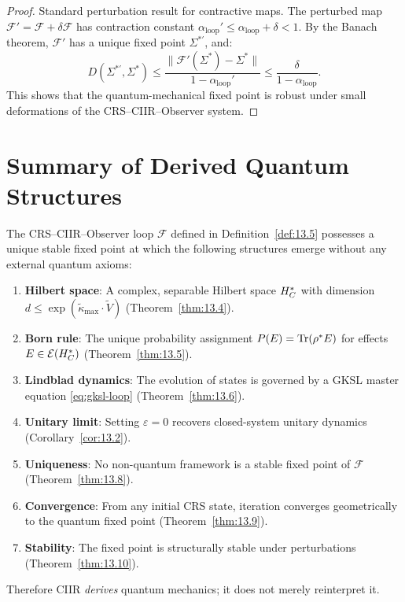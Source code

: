 \begin{proof}
Standard perturbation result for contractive maps.  The perturbed
map $\mathcal{F}' = \mathcal{F} + \delta\mathcal{F}$ has contraction
constant $\alpha_{\mathrm{loop}}' \leq \alpha_{\mathrm{loop}} + \delta
< 1$.  By the Banach theorem, $\mathcal{F}'$ has a unique fixed point
$\Sigma^{*\prime}$, and:
\[
  D(\Sigma^{*\prime}, \Sigma^*)
  \leq \frac{\|\mathcal{F}'(\Sigma^*) - \Sigma^*\|}{1 - \alpha_{\mathrm{loop}}'}
  \leq \frac{\delta}{1 - \alpha_{\mathrm{loop}}}.
\]
This shows that the quantum-mechanical fixed point is robust under
small deformations of the CRS--CIIR--Observer system.
\end{proof}

\section{Summary of Derived Quantum Structures}
\label{sec:ch13:summary}

\begin{theorem}\label{thm:13.11}
The CRS--CIIR--Observer loop $\mathcal{F}$ defined in
Definition~\ref{def:13.5} possesses a unique stable fixed point at
which the following structures emerge without any external quantum
axioms:
\begin{enumerate}
  \item \textbf{Hilbert space}: A complex, separable Hilbert space
    $H_C^*$ with dimension $d \leq \exp(\tilde{\kappa}_{\max} \cdot
    \tilde{V})$ (Theorem~\ref{thm:13.4}).
  \item \textbf{Born rule}: The unique probability assignment
    $P(E) = \mathrm{Tr}(\rho^* E)$ for effects $E \in \mathcal{E}(H_C^*)$
    (Theorem~\ref{thm:13.5}).
  \item \textbf{Lindblad dynamics}: The evolution of states is
    governed by a GKSL master equation \eqref{eq:gksl-loop}
    (Theorem~\ref{thm:13.6}).
  \item \textbf{Unitary limit}: Setting $\varepsilon = 0$
    recovers closed-system unitary dynamics
    (Corollary~\ref{cor:13.2}).
  \item \textbf{Uniqueness}: No non-quantum framework is a stable
    fixed point of $\mathcal{F}$ (Theorem~\ref{thm:13.8}).
  \item \textbf{Convergence}: From any initial CRS state, iteration
    converges geometrically to the quantum fixed point
    (Theorem~\ref{thm:13.9}).
  \item \textbf{Stability}: The fixed point is structurally stable
    under perturbations (Theorem~\ref{thm:13.10}).
\end{enumerate}
Therefore CIIR \emph{derives} quantum mechanics; it does not merely
reinterpret it.
\end{theorem}

